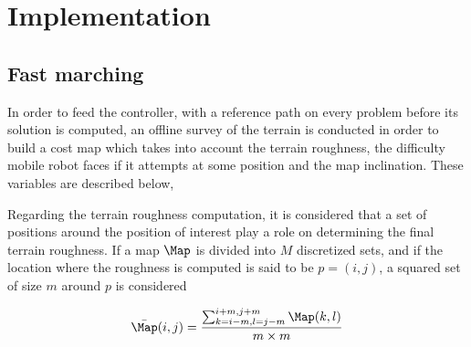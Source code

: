 \chapter{Implementation}
\label{chapter:implementation}



\section{Fast marching}
\label{section:fastMarching}

In order to feed the controller, with a reference path on every problem before its solution is computed, an offline survey of the terrain is conducted in order to build a cost map which takes into account the terrain roughness, the difficulty  mobile robot faces if it attempts at some position and the map inclination. These variables are described below,

Regarding the terrain roughness computation, it is considered that a set of positions around the position of interest play a role on determining the final terrain roughness. If a map $\Map$ is divided into $M$ discretized sets, and if the location where the roughness is computed is said to be $p = (i, j)$, a squared set of size $m$ around $p$ is considered

\begin{equation}
	\bar{\Map}(i, j) = \frac{\sum_{k = i-m, l = j-m}^{i+m, j+m} \Map(k, l)}{m \times m}
\end{equation}



